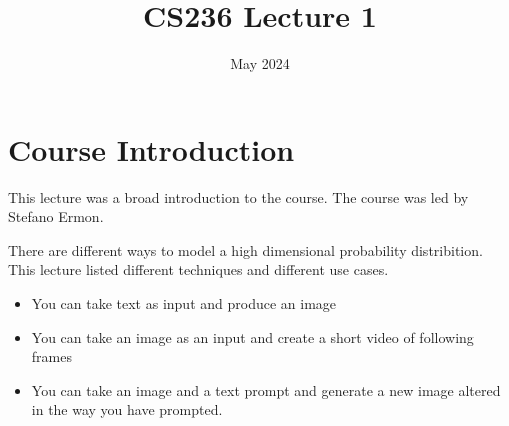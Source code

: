 \documentclass{article}
\title{CS236 Lecture 1}
\date{May 2024}
\begin{document}
\maketitle
\section{Course Introduction}
This lecture was a broad introduction to the course.
The course was led by Stefano Ermon.

There are different ways to model a high dimensional probability distribition.
This lecture listed different techniques and different use cases.

\begin{itemize}
    \item You can take text as input and produce an image
    \item You can take an image as an input and create a short video of following frames
    \item You can take an image and a text prompt and generate a new image altered in the way you have prompted.
  \end{itemize}
\end{document}
